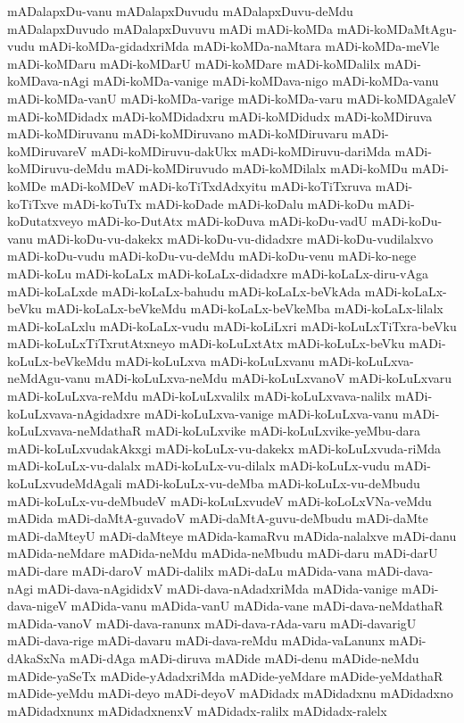 {mADalapxDu-vanu
mADalapxDuvudu
mADalapxDuvu-deMdu
mADalapxDuvudo
mADalapxDuvuvu
mADi
mADi-koMDa
mADi-koMDaMtAgu-vudu
mADi-koMDa-gidadxriMda
mADi-koMDa-naMtara
mADi-koMDa-meVle
mADi-koMDaru
mADi-koMDarU
mADi-koMDare
mADi-koMDalilx
mADi-koMDava-nAgi
mADi-koMDa-vanige
mADi-koMDava-nigo
mADi-koMDa-vanu
mADi-koMDa-vanU
mADi-koMDa-varige
mADi-koMDa-varu
mADi-koMDAgaleV
mADi-koMDidadx
mADi-koMDidadxru
mADi-koMDidudx
mADi-koMDiruva
mADi-koMDiruvanu
mADi-koMDiruvano
mADi-koMDiruvaru
mADi-koMDiruvareV
mADi-koMDiruvu-dakUkx
mADi-koMDiruvu-dariMda
mADi-koMDiruvu-deMdu
mADi-koMDiruvudo
mADi-koMDilalx
mADi-koMDu
mADi-koMDe
mADi-koMDeV
mADi-koTiTxdAdxyitu
mADi-koTiTxruva
mADi-koTiTxve
mADi-koTuTx
mADi-koDade
mADi-koDalu
mADi-koDu
mADi-koDutatxveyo
mADi-ko-DutAtx
mADi-koDuva
mADi-koDu-vadU
mADi-koDu-vanu
mADi-koDu-vu-dakekx
mADi-koDu-vu-didadxre
mADi-koDu-vudilalxvo
mADi-koDu-vudu
mADi-koDu-vu-deMdu
mADi-koDu-venu
mADi-ko-nege
mADi-koLu
mADi-koLaLx
mADi-koLaLx-didadxre
mADi-koLaLx-diru-vAga
mADi-koLaLxde
mADi-koLaLx-bahudu
mADi-koLaLx-beVkAda
mADi-koLaLx-beVku
mADi-koLaLx-beVkeMdu
mADi-koLaLx-beVkeMba
mADi-koLaLx-lilalx
mADi-koLaLxlu
mADi-koLaLx-vudu
mADi-koLiLxri
mADi-koLuLxTiTxra-beVku
mADi-koLuLxTiTxrutAtxneyo
mADi-koLuLxtAtx
mADi-koLuLx-beVku
mADi-koLuLx-beVkeMdu
mADi-koLuLxva
mADi-koLuLxvanu
mADi-koLuLxva-neMdAgu-vanu
mADi-koLuLxva-neMdu
mADi-koLuLxvanoV
mADi-koLuLxvaru
mADi-koLuLxva-reMdu
mADi-koLuLxvalilx
mADi-koLuLxvava-nalilx
mADi-koLuLxvava-nAgidadxre
mADi-koLuLxva-vanige
mADi-koLuLxva-vanu
mADi-koLuLxvava-neMdathaR
mADi-koLuLxvike
mADi-koLuLxvike-yeMbu-dara
mADi-koLuLxvudakAkxgi
mADi-koLuLx-vu-dakekx
mADi-koLuLxvuda-riMda
mADi-koLuLx-vu-dalalx
mADi-koLuLx-vu-dilalx
mADi-koLuLx-vudu
mADi-koLuLxvudeMdAgali
mADi-koLuLx-vu-deMba
mADi-koLuLx-vu-deMbudu
mADi-koLuLx-vu-deMbudeV
mADi-koLuLxvudeV
mADi-koLoLxVNa-veMdu
mADida
mADi-daMtA-guvadoV
mADi-daMtA-guvu-deMbudu
mADi-daMte
mADi-daMteyU
mADi-daMteye
mADida-kamaRvu
mADida-nalalxve
mADi-danu
mADida-neMdare
mADida-neMdu
mADida-neMbudu
mADi-daru
mADi-darU
mADi-dare
mADi-daroV
mADi-dalilx
mADi-daLu
mADida-vana
mADi-dava-nAgi
mADi-dava-nAgididxV
mADi-dava-nAdadxriMda
mADida-vanige
mADi-dava-nigeV
mADida-vanu
mADida-vanU
mADida-vane
mADi-dava-neMdathaR
mADida-vanoV
mADi-dava-ranunx
mADi-dava-rAda-varu
mADi-davarigU
mADi-dava-rige
mADi-davaru
mADi-dava-reMdu
mADida-vaLanunx
mADi-dAkaSxNa
mADi-dAga
mADi-diruva
mADide
mADi-denu
mADide-neMdu
mADide-yaSeTx
mADide-yAdadxriMda
mADide-yeMdare
mADide-yeMdathaR
mADide-yeMdu
mADi-deyo
mADi-deyoV
mADidadx
mADidadxnu
mADidadxno
mADidadxnunx
mADidadxnenxV
mADidadx-ralilx
mADidadx-ralelx
}
